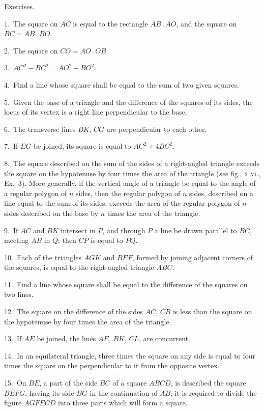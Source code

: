 \documentclass[oneside]{book}
\newcommand\exhead[1]{
\Needspace*{5\baselineskip}\begin{center}
\textsf{#1}
\end{center}
}
\begin{document}
\exhead{Exercises.}

\begin{footnotesize}
1.~The square on $AC$ is equal to the rectangle $AB\,.\,AO$, and
the square on $BC = AB\,.\,BO$.

2.~The square on $CO = AO\,.\,OB$.

3.~$AC^2 - BC^2 = AO^2 - BO^2$.

4.~Find a line whose square shall be equal to the sum of two
given squares.

5.~Given the base of a triangle and the difference of the
squares of its sides, the locus of its vertex is a right line perpendicular
to the base.

6.~The transverse lines $BK$, $CG$ are perpendicular to each
other.

7.~If $EG$ be joined, its square is equal to $AC^2 + 4BC^2$.

8.~The square described on the sum of the sides of a right-angled
triangle exceeds the square on the hypotenuse by four
times the area of the triangle (\emph{see} fig., \textsc{xlvi}., Ex.~3).  More
generally, if the vertical angle of a triangle be equal to the angle
of a regular polygon of $n$ sides, then the regular polygon of
$n$ sides, described on a line equal to the sum of its sides, exceeds
the area of the regular polygon of $n$ sides described on the base
by $n$ times the area of the triangle.

9.~If $AC$ and $BK$ intersect in $P$, and through $P$ a line be drawn
parallel to $BC$, meeting $AB$ in $Q$; then $CP$ is equal to $PQ$.

10.~Each of the triangles $AGK$ and $BEF$, formed by joining
adjacent corners of the squares, is equal to the right-angled triangle
$ABC$.

11.~Find a line whose square shall be equal to the difference
of the squares on two lines.

12.~The square on the difference of the sides $AC$, $CB$ is less
than the square on the hypotenuse by four times the area of the
triangle.

13.~If $AE$ be joined, the lines $AE$, $BK$, $CL$, are concurrent.

14.~In an equilateral triangle, three times the square on any
side is equal to four times the square on the perpendicular to it
from the opposite vertex.

15.~On $BE$, a part of the side $BC$ of a square $ABCD$, is
described the square $BEFG$, having its side $BG$ in the continuation
of $AB$; it is required to divide the figure $AGFECD$ into
three parts which will form a square.


\end{footnotesize}
\end{document}
